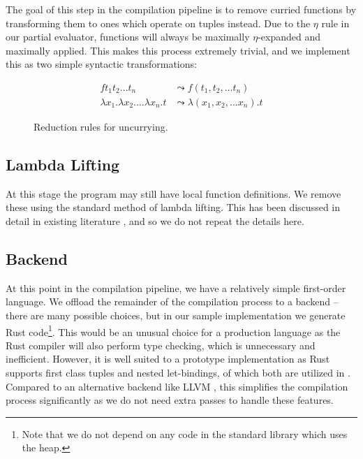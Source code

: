 \documentclass[runningheads]{llncs}
\begin{document}
The goal of this step in the compilation pipeline is to remove curried functions by transforming them to ones which operate on tuples instead. Due to the $\eta$ rule in our partial evaluator, functions will always be maximally $\eta$-expanded and maximally applied. This makes this process extremely trivial, and we implement this as two simple syntactic transformations:

\begin{figure*}[h]
  \begin{minipage}[c]{\textwidth}
    \begin{align*}
      f t_1 t_2 \ldots t_n &\leadsto f(t_1, t_2, \ldots t_n) \\
      \lambda x_1. \lambda x_2. \ldots \lambda x_n. t &\leadsto \lambda (x_1, x_2, \ldots x_n). t
    \end{align*}
  \end{minipage}

  \caption{Reduction rules for uncurrying.}
  \label{fig:uncurrying-rules}
\end{figure*}

\subsection{Lambda Lifting}

At this stage the program may still have local function definitions. We remove these using the standard method of lambda lifting. This has been discussed in detail in existing literature \cite{danvy2002lambda,morazan2008optimal}, and so we do not repeat the details here.

\subsection{Backend}

At this point in the compilation pipeline, we have a relatively simple first-order language. We offload the remainder of the compilation process to a backend -- there are many possible choices, but in our sample implementation we generate Rust code\footnote{Note that we do not depend on any code in the standard library which uses the heap.}. This would be an unusual choice for a production language as the Rust compiler will also perform type checking, which is unnecessary and inefficient. However, it is well suited to a prototype implementation as Rust supports first class tuples and nested let-bindings, of which both are utilized in \core{}. Compared to an alternative backend like LLVM \cite{lattner2004llvm}, this simplifies the compilation process significantly as we do not need extra passes to handle these features.
\end{document}
